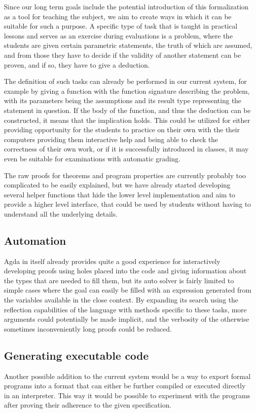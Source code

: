 Since our long term goals include the potential introduction of this formalization as a tool for teaching the subject, we aim to create ways in which it can be suitable for such a purpose. A specific type of task that is taught in practical lessons and serves as an exercise during evaluations is a problem, where the students are given certain parametric statements, the truth of which are assumed, and from those they have to decide if the validity of another statement can be proven, and if so, they have to give a deduction.

The definition of such tasks can already be performed in our current system, for example by giving a function with the function signature describing the problem, with its parameters being the assumptions and its result type representing the statement in question. If the body of the function, and thus the deduction can be constructed, it means that the implication holds. This could be utilized for either providing opportunity for the students to practice on their own with the their computers providing them interactive help and being able to check the correctness of their own work, or if it is successfully introduced in classes, it may even be suitable for examinations with automatic grading.

The raw proofs for theorems and program properties are currently probably too complicated to be easily explained, but we have already started developing several helper functions that hide the lower level implementation and aim to provide a higher level interface, that could be used by students without having to understand all the underlying details.

\subsection{Automation}
Agda in itself already provides quite a good experience for interactively developing proofs using holes placed into the code and giving information about the types that are needed to fill them, but its auto solver is fairly limited to simple cases where the goal can easily be filled with an expression generated from the variables available in the close context. By expanding its search using the reflection capabilities of the language with methods specific to these tasks, more arguments could potentially be made implicit, and the verbosity of the otherwise sometimes inconveniently long proofs could be reduced.

\subsection{Generating executable code}
Another possible addition to the current system would be a way to export formal programs into a format that can either be further compiled or executed directly in an interpreter. This way it would be possible to experiment with the programs after proving their adherence to the given specification.